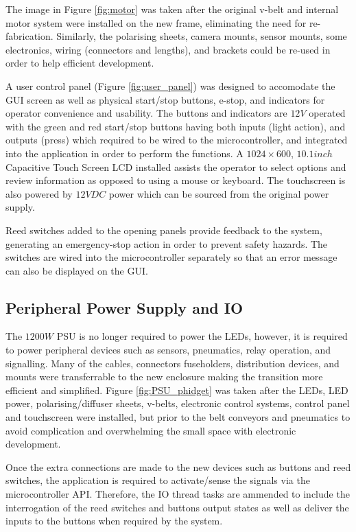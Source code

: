 \documentclass[fleqn,twoside,12pt]{report}
\begin{document}
The image in Figure \ref{fig:motor} was taken after the original v-belt and internal motor system were installed on the new frame, eliminating the need for re-fabrication. Similarly, the polarising sheets, camera mounts, sensor mounts, some electronics, wiring (connectors and lengths), and brackets could be re-used in order to help efficient development.

A user control panel (Figure \ref{fig:user_panel}) was designed to accomodate the GUI screen as well as physical start/stop buttons, e-stop, and indicators for operator convenience and usability. The buttons and indicators are $12V$ operated with the green and red start/stop buttons having both inputs (light action), and outputs (press) which required to be wired to the microcontroller, and integrated into the application in order to perform the functions. A $1024\times600$, $10.1inch$ Capacitive Touch Screen LCD installed assists the operator to select options and review information as opposed to using a mouse or keyboard. The touchscreen is also powered by $12VDC$ power which can be sourced from the original power supply.

Reed switches added to the opening panels provide feedback to the system, generating an emergency-stop action in order to prevent safety hazards. The switches are wired into the microcontroller separately so that an error message can also be displayed on the GUI.



\subsection{Peripheral Power Supply and IO}

The $1200W$ PSU is no longer required to power the LEDs, however, it is required to power peripheral devices such as sensors, pneumatics, relay operation, and signalling. Many of the cables, connectors fuseholders, distribution devices, and mounts were transferrable to the new enclosure making the transition more efficient and simplified. Figure \ref{fig:PSU_phidget} was taken after the LEDs, LED power, polarising/diffuser sheets, v-belts, electronic control systems, control panel and touchscreen were installed, but prior to the belt conveyors and pneumatics to avoid complication and overwhelming the small space with electronic development.

Once the extra connections are made to the new devices such as buttons and reed switches, the application is required to activate/sense the signals via the microcontroller API. Therefore, the IO thread tasks are ammended to include the interrogation of the reed switches and buttons output states as well as deliver the inputs to the buttons when required by the system. 
\end{document}
